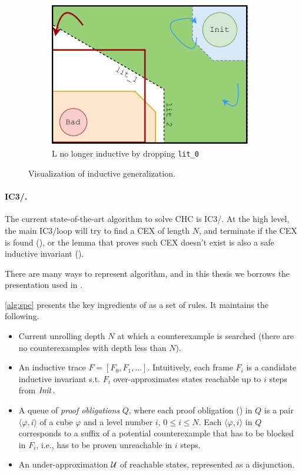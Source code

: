 \begin{figure}[t]
\begin{subfigure}[b]{0.3\textwidth}
    \includegraphics[width=0.99\textwidth]{figures/doping-lemma_not_ind.pdf}
    \caption{L no longer inductive by dropping \texttt{lit\_0}}
    \label{fig:not_ind_gen}
	\end{subfigure}

  \caption{Visualization of inductive generalization.}
  \label{fig:vis_ind_gen}
\end{figure}




\paragraph{IC3/\spc.}
The current state-of-the-art algorithm to solve CHC is IC3/\spc \cite{spacer}.
At the high level, the main IC3/\spc loop will try to find a CEX of length $N$,
and terminate if the CEX is found (\unsafe), or the lemma that proves such CEX
doesn't exist is also a safe inductive invariant (\safe). 

There are many ways to represent \spc algorithm, and in this thesis we borrows
the presentation used in \cite{GSpacer}.

\cref{alg:spc} presents the key ingredients of \spc as a set of rules. It
maintains the following.
\begin{itemize}
  \item Current unrolling depth $N$ at
    which a counterexample is searched (there are no counterexamples with depth less
    than $N$).
  \item An inductive trace $F = [F_0, F_1, \ldots]$.
    Intuitively, each frame $F_i$ is a candidate inductive invariant s.t.
    $F_i$ over-approximates states reachable up to $i$ steps from $\mathit{Init}$.

  \item A queue of \emph{proof obligations} $Q$, where each proof obligation
    (\pob) in $Q$ is a pair $\langle \varphi, i \rangle$ of a cube $\varphi$ and a
    level number $i$, $0 \leq i \leq N$.
    Each \pob $\langle \varphi, i \rangle$ in $Q$ corresponds to a suffix of a potential
    counterexample that has to be blocked in $F_i$, i.e., has to be proven unreachable in $i$ steps.
  \item An under-approximation $\mathcal{U}$ of reachable
    states, represented as a disjunction.
\end{itemize}


